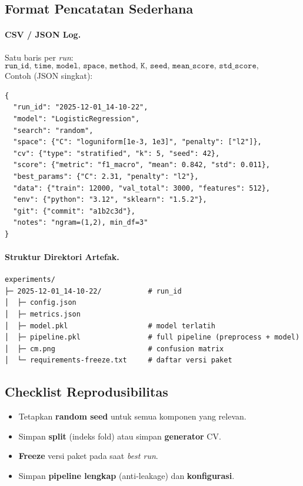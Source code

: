 \documentclass[11pt,a4paper]{article}
\begin{document}
\subsection{Format Pencatatan Sederhana}
\paragraph{CSV / JSON Log.} Satu baris per \emph{run}:
\[
\texttt{run\_id, time, model, space, method, K, seed, mean\_score, std\_score, best\_params, notes}
\]
Contoh (JSON singkat):
\begin{lstlisting}
{
  "run_id": "2025-12-01_14-10-22",
  "model": "LogisticRegression",
  "search": "random",
  "space": {"C": "loguniform[1e-3, 1e3]", "penalty": ["l2"]},
  "cv": {"type": "stratified", "k": 5, "seed": 42},
  "score": {"metric": "f1_macro", "mean": 0.842, "std": 0.011},
  "best_params": {"C": 2.31, "penalty": "l2"},
  "data": {"train": 12000, "val_total": 3000, "features": 512},
  "env": {"python": "3.12", "sklearn": "1.5.2"},
  "git": {"commit": "a1b2c3d"},
  "notes": "ngram=(1,2), min_df=3"
}
\end{lstlisting}

\paragraph{Struktur Direktori Artefak.}
\begin{lstlisting}
experiments/
├─ 2025-12-01_14-10-22/           # run_id
│  ├─ config.json
│  ├─ metrics.json
│  ├─ model.pkl                   # model terlatih
│  ├─ pipeline.pkl                # full pipeline (preprocess + model)
│  ├─ cm.png                      # confusion matrix
│  └─ requirements-freeze.txt     # daftar versi paket
\end{lstlisting}

\subsection{Checklist Reprodusibilitas}
\begin{itemize}[leftmargin=1.2em]
  \item Tetapkan \textbf{random seed} untuk semua komponen yang relevan.
  \item Simpan \textbf{split} (indeks fold) atau simpan \textbf{generator} CV.
  \item \textbf{Freeze} versi paket pada saat \emph{best run}.
  \item Simpan \textbf{pipeline lengkap} (anti-leakage) dan \textbf{konfigurasi}.
\end{itemize}
\end{document}
